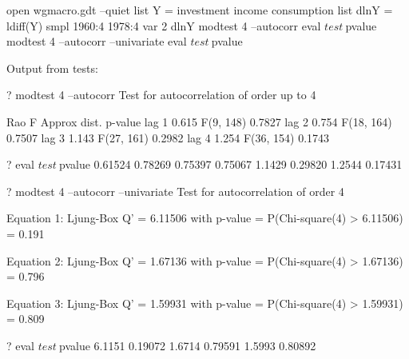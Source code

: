 \begin{script}[htbp]
\begin{scode}
open wgmacro.gdt --quiet
list Y = investment income consumption
list dlnY = ldiff(Y)
smpl 1960:4 1978:4
var 2 dlnY
modtest 4 --autocorr
eval $test ~ $pvalue
modtest 4 --autocorr --univariate
eval $test ~ $pvalue
\end{scode}

Output from tests:
\begin{outbit}
? modtest 4 --autocorr
Test for autocorrelation of order up to 4

          Rao F   Approx dist.  p-value
lag 1     0.615    F(9, 148)     0.7827
lag 2     0.754    F(18, 164)    0.7507
lag 3     1.143    F(27, 161)    0.2982
lag 4     1.254    F(36, 154)    0.1743

? eval $test ~ $pvalue
     0.61524      0.78269 
     0.75397      0.75067 
      1.1429      0.29820 
      1.2544      0.17431 

? modtest 4 --autocorr --univariate
Test for autocorrelation of order 4

Equation 1:
Ljung-Box Q' = 6.11506 with p-value = P(Chi-square(4) > 6.11506) = 0.191

Equation 2:
Ljung-Box Q' = 1.67136 with p-value = P(Chi-square(4) > 1.67136) = 0.796

Equation 3:
Ljung-Box Q' = 1.59931 with p-value = P(Chi-square(4) > 1.59931) = 0.809

? eval $test ~ $pvalue
      6.1151      0.19072 
      1.6714      0.79591 
      1.5993      0.80892 
\end{outbit}
\end{script}

